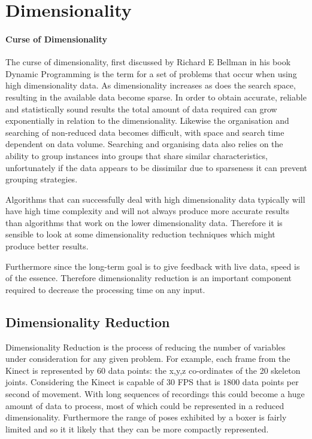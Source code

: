 \section{Dimensionality}
\paragraph{Curse of Dimensionality}
The curse of dimensionality, first discussed by Richard E Bellman in his book Dynamic Programming \cite{dynprog} is the term for a set of problems that occur when using high dimensionality data. As dimensionality increases as does the search space, resulting in the available data become sparse. In order to obtain accurate, reliable and statistically sound results the total amount of data required can grow exponentially in relation to the dimensionality. Likewise the organisation and searching of non-reduced data becomes difficult, with space and search time dependent on data volume. Searching and organising data also relies on the ability to group instances into groups that share similar characteristics, unfortunately if the data appears to be dissimilar due to sparseness it can prevent grouping strategies.

Algorithms that can successfully deal with high dimensionality data typically will have high time complexity and will not always produce more accurate results than algorithms that work on the lower dimensionality data. Therefore it is sensible to look at some dimensionality reduction techniques which might produce better results.

Furthermore since the long-term goal is to give feedback with live data, speed is of the essence. Therefore dimensionality reduction is an important component required to decrease the processing time on any input.

\subsection{Dimensionality Reduction}
Dimensionality Reduction is the process of reducing the number of variables under consideration for any given problem. For example, each frame from the Kinect is represented by 60 data points: the x,y,z co-ordinates of the 20 skeleton joints. Considering the Kinect is capable of 30 FPS that is $1800$ data points per second of movement. With long sequences of recordings this could become a huge amount of data to process, most of which could be represented in a reduced dimensionality.
Furthermore the range of poses exhibited by a boxer is fairly limited and so it it likely that they can be more compactly represented.



